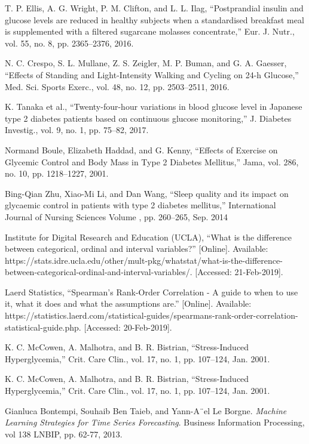 \begin{thebibliography}{AAA}
T. P. Ellis, A. G. Wright, P. M. Clifton, and L. L. Ilag, “Postprandial insulin and glucose levels are reduced in healthy subjects when a standardised breakfast meal is supplemented with a filtered sugarcane molasses concentrate,” Eur. J. Nutr., vol. 55, no. 8, pp. 2365–2376, 2016.

N. C. Crespo, S. L. Mullane, Z. S. Zeigler, M. P. Buman, and G. A. Gaesser, “Effects of Standing and Light-Intensity Walking and Cycling on 24-h Glucose,” Med. Sci. Sports Exerc., vol. 48, no. 12, pp. 2503–2511, 2016.

K. Tanaka et al., “Twenty-four-hour variations in blood glucose level in Japanese type 2 diabetes patients based on continuous glucose monitoring,” J. Diabetes Investig., vol. 9, no. 1, pp. 75–82, 2017.

Normand Boule, Elizabeth Haddad, and G. Kenny, “Effects of Exercise on Glycemic Control and Body Mass in Type 2 Diabetes Mellitus,” Jama, vol. 286, no. 10, pp. 1218–1227, 2001.

Bing-Qian Zhu, Xiao-Mi Li, and Dan Wang, “Sleep quality and its impact on glycaemic control in patients with type 2 diabetes mellitus,” International Journal of Nursing Sciences Volume , pp. 260–265, Sep. 2014

Institute for Digital Research and Education (UCLA), “What is the difference between categorical, ordinal and interval variables?” [Online]. Available: https://stats.idre.ucla.edu/other/mult-pkg/whatstat/what-is-the-difference-between-categorical-ordinal-and-interval-variables/. [Accessed: 21-Feb-2019].

Laerd Statistics, “Spearman’s Rank-Order Correlation - A guide to when to use it, what it does and what the assumptions are.” [Online]. Available: https://statistics.laerd.com/statistical-guides/spearmans-rank-order-correlation-statistical-guide.php. [Accessed: 20-Feb-2019].

K. C. McCowen, A. Malhotra, and B. R. Bistrian, “Stress-Induced Hyperglycemia,” Crit. Care Clin., vol. 17, no. 1, pp. 107–124, Jan. 2001.

K. C. McCowen, A. Malhotra, and B. R. Bistrian, “Stress-Induced Hyperglycemia,” Crit. Care Clin., vol. 17, no. 1, pp. 107–124, Jan. 2001.

Gianluca Bontempi, Souhaib Ben Taieb, and Yann-A¨el Le Borgne. 
\textit{Machine Learning Strategies for Time Series Forecasting}.
Business Information Processing, vol 138 LNBIP, pp. 62-77, 2013.

\end{thebibliography}

%    
%    
